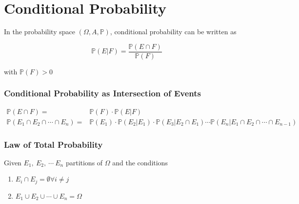 
\section{Conditional Probability}

    In the probability space \( ( \Omega, A, \mathbb{P}) \), conditional probability can be written as

    \begin{equation}
        \mathbb{P} (E|F) = \frac{\mathbb{P} (E \cap F)}{\mathbb{P} (F)}
    \end{equation}

    \noindent
    with \(\mathbb{P} (F) > 0\)

        \subsubsection{Conditional Probability as Intersection of Events}

            \begin{equation}
            \begin{split}
                \mathbb{P} (E \cap F) = & \mathbb{P} (F) \cdot \mathbb{P} (E | F) \\
                \mathbb{P} (E_1 \cap E_2 \cap \cdots \cap E_n ) = & \mathbb{P} (E_1) \cdot \mathbb{P} (E_2 | E_1) \cdot \mathbb{P} (E_3 | E_2 \cap E_1) \cdots \mathbb{P} (E_n | E_1 \cap E_2 \cap \cdots \cap E_{n-1})
            \end{split}
            \end{equation}

        \subsubsection{Law of Total Probability}

            Given \(E_1, \ E_2, \ \cdots \ E_n\) partitions of \(\Omega\) and the conditions

            \begin{enumerate}
                \item \(E_i \cap E_j = \emptyset \forall i \neq j\)
                \item \(E_1 \cup E_2 \cup \cdots \cup E_n = \Omega\)
            \end{enumerate}

